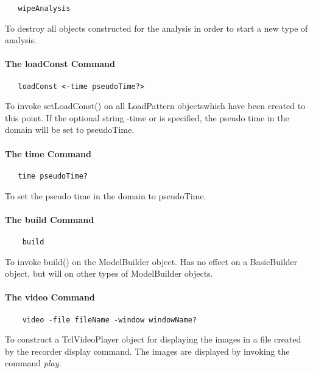 \documentclass[12pt]{article}
\begin{document}
{\sf\small
\begin{verbatim}
   wipeAnalysis
\end{verbatim}
}

\noindent To destroy all objects constructed for the analysis in order
to start a new type of analysis.

\paragraph {The loadConst Command}

{\sf\small
\begin{verbatim}
   loadConst <-time pseudoTime?>
\end{verbatim}
}

\noindent To invoke setLoadConst() on all LoadPattern objectswhich
have been created to this point. If the optional string -time or
is specified, the pseudo time in the domain will be set to pseudoTime.

\paragraph {The time Command}

{\sf\small
\begin{verbatim}
   time pseudoTime?
\end{verbatim}
}

\noindent To set the pseudo time in the domain to pseudoTime.

\paragraph {The build Command}

{\sf\small
\begin{verbatim}
    build
\end{verbatim}
}

\noindent To invoke build() on the ModelBuilder object. Has no effect
on a BasicBuilder object, but will on other types of ModelBuilder objects.

\paragraph {The video Command}

{\sf\small
\begin{verbatim}
    video -file fileName -window windowName?
\end{verbatim}
}

\noindent To construct a TclVideoPlayer object for displaying the images in a file
created by the recorder display command. The images are displayed by invoking the 
command {\em play}.
\end{document}
